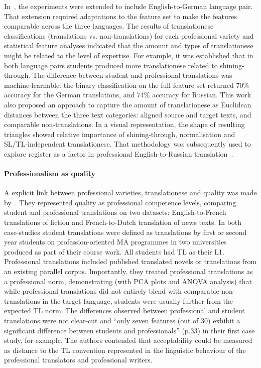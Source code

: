 In~\citet{Kunilovskaya2020vars}, the experiments were extended to include English-to-German language pair. That extension required adaptations to the feature set to make the features comparable across the three languages. 
The results of translationese classifications (translations vs. non-translations) for each professional variety and statistical feature analyses indicated that the amount and types of translationese might be related to the level of expertise. For example, it was established that in both language pairs students produced more translationese related to shining-through. 
The difference between student and professional translations was machine-learnable: the binary classification on the full feature set returned 70\% accuracy for the German translations, and 74\% accuracy for Russian.
This work also proposed an approach to capture the amount of translationese as Euclidean distances between the three text categories: aligned source and target texts, and comparable non-translations. In a visual representation, the shape of resulting triangles showed relative importance of shining-through, normalisation and SL/TL-independent translationese. That methodology was subsequently used to explore register as a factor in professional English-to-Russian translation~\cite{Kunilovskaya2021regs}.

\paragraph{Professionalism as quality} A explicit link between professional varieties, translationese and quality was made by~\citet{Sutter2017}. They represented quality as professional competence levels, comparing student and professional translations on two datasets: English-to-French translations of fiction and French-to-Dutch translation of news texts. In both case-studies student translations were defined as translations by first or second year students on profession-oriented MA programmes in two universities produced as part of their course work. All students had TL as their \gls{L1}. Professional translations included published translated novels or translations from an existing parallel corpus.
Importantly, they treated professional translations as a professional norm, demonstrating (with PCA plots and ANOVA analysis) that while professional translations did not entirely blend with comparable non-translations in the target language, students were usually further from the expected TL norm. The differences observed between professional and student translations were not clear-cut and ``only seven features (out of 30) exhibit a significant difference between students and professionals'' (p.33) in their first case study, for example. The authors contended that acceptability could be measured as distance to the TL convention represented in the linguistic behaviour of the professional translators and professional writers.


